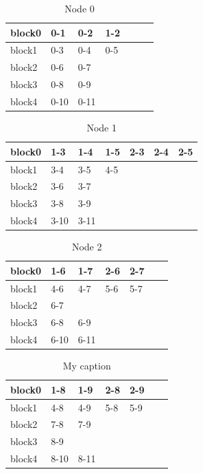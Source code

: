 \documentclass[a4paper]{article}
\begin{document}
\begin{table}[]
\centering
\caption{Node 0}
\label{my-label}
\begin{tabular}{l|llllll}
block0 & 0-1  & 0-2  & 1-2 &  &  &  \\ \hline
block1 & 0-3  & 0-4  & 0-5 &  &  &  \\ \hline
block2 & 0-6  & 0-7  &     &  &  &  \\ \hline
block3 & 0-8  & 0-9  &     &  &  &  \\ \hline
block4 & 0-10 & 0-11 &     &  &  &  
\end{tabular}
\end{table}

\begin{table}[]
\centering
\caption{Node 1}
\label{my-label}
\begin{tabular}{l|llllll}
block0 & 1-3  & 1-4  & 1-5 & 2-3 & 2-4 & 2-5  \\ \hline
block1 & 3-4  & 3-5  & 4-5 &     &     &      \\ \hline
block2 & 3-6  & 3-7  &     &     &     &      \\ \hline
block3 & 3-8  & 3-9  &     &     &     &      \\ \hline
block4 & 3-10 & 3-11 &     &     &     &      
\end{tabular}
\end{table}

\begin{table}[]
\centering
\caption{Node 2}
\label{my-label}
\begin{tabular}{l|llllll}
block0 & 1-6  & 1-7  & 2-6 & 2-7 &  &  \\ \hline
block1 & 4-6  & 4-7  & 5-6 & 5-7 &  &  \\ \hline
block2 & 6-7  &      &     &     &  &  \\ \hline
block3 & 6-8  & 6-9  &     &     &  &  \\ \hline
block4 & 6-10 & 6-11 &     &     &  & 
\end{tabular}
\end{table}

\begin{table}[]
\centering
\caption{My caption}
\label{my-label}
\begin{tabular}{l|llllll}
block0 & 1-8  & 1-9  & 2-8 & 2-9 &  &  \\ \hline
block1 & 4-8  & 4-9  & 5-8 & 5-9 &  &  \\ \hline
block2 & 7-8  & 7-9  &     &     &  &  \\ \hline
block3 & 8-9  &      &     &     &  &  \\ \hline
block4 & 8-10 & 8-11 &     &     &  & 
\end{tabular}
\end{table}
\end{document}
